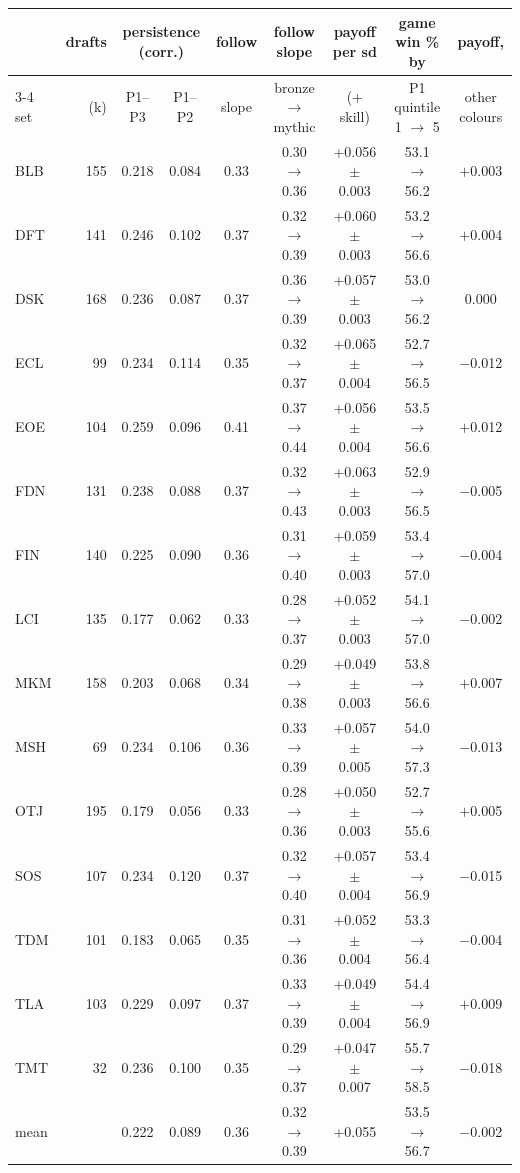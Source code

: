 \begin{tabular}{lr cc c c c c c}
\toprule
 & drafts & \multicolumn{2}{c}{persistence (corr.)} & follow & follow slope & payoff per sd & game win \% by & payoff, \\
\cmidrule(lr){3-4}
set & (k) & P1--P3 & P1--P2 & slope & bronze $\to$ mythic & (+ skill) & P1 quintile 1 $\to$ 5 & other colours \\
\midrule
BLB & 155 & 0.218 & 0.084 & 0.33 & 0.30 $\to$ 0.36 & +0.056 $\pm$ 0.003 & 53.1 $\to$ 56.2 & $+$0.003 \\
DFT & 141 & 0.246 & 0.102 & 0.37 & 0.32 $\to$ 0.39 & +0.060 $\pm$ 0.003 & 53.2 $\to$ 56.6 & $+$0.004 \\
DSK & 168 & 0.236 & 0.087 & 0.37 & 0.36 $\to$ 0.39 & +0.057 $\pm$ 0.003 & 53.0 $\to$ 56.2 & 0.000 \\
ECL & 99 & 0.234 & 0.114 & 0.35 & 0.32 $\to$ 0.37 & +0.065 $\pm$ 0.004 & 52.7 $\to$ 56.5 & $-$0.012 \\
EOE & 104 & 0.259 & 0.096 & 0.41 & 0.37 $\to$ 0.44 & +0.056 $\pm$ 0.004 & 53.5 $\to$ 56.6 & $+$0.012 \\
FDN & 131 & 0.238 & 0.088 & 0.37 & 0.32 $\to$ 0.43 & +0.063 $\pm$ 0.003 & 52.9 $\to$ 56.5 & $-$0.005 \\
FIN & 140 & 0.225 & 0.090 & 0.36 & 0.31 $\to$ 0.40 & +0.059 $\pm$ 0.003 & 53.4 $\to$ 57.0 & $-$0.004 \\
LCI & 135 & 0.177 & 0.062 & 0.33 & 0.28 $\to$ 0.37 & +0.052 $\pm$ 0.003 & 54.1 $\to$ 57.0 & $-$0.002 \\
MKM & 158 & 0.203 & 0.068 & 0.34 & 0.29 $\to$ 0.38 & +0.049 $\pm$ 0.003 & 53.8 $\to$ 56.6 & $+$0.007 \\
MSH & 69 & 0.234 & 0.106 & 0.36 & 0.33 $\to$ 0.39 & +0.057 $\pm$ 0.005 & 54.0 $\to$ 57.3 & $-$0.013 \\
OTJ & 195 & 0.179 & 0.056 & 0.33 & 0.28 $\to$ 0.36 & +0.050 $\pm$ 0.003 & 52.7 $\to$ 55.6 & $+$0.005 \\
SOS & 107 & 0.234 & 0.120 & 0.37 & 0.32 $\to$ 0.40 & +0.057 $\pm$ 0.004 & 53.4 $\to$ 56.9 & $-$0.015 \\
TDM & 101 & 0.183 & 0.065 & 0.35 & 0.31 $\to$ 0.36 & +0.052 $\pm$ 0.004 & 53.3 $\to$ 56.4 & $-$0.004 \\
TLA & 103 & 0.229 & 0.097 & 0.37 & 0.33 $\to$ 0.39 & +0.049 $\pm$ 0.004 & 54.4 $\to$ 56.9 & $+$0.009 \\
TMT & 32 & 0.236 & 0.100 & 0.35 & 0.29 $\to$ 0.37 & +0.047 $\pm$ 0.007 & 55.7 $\to$ 58.5 & $-$0.018 \\
\midrule
mean & & 0.222 & 0.089 & 0.36 & 0.32 $\to$ 0.39 & +0.055 & 53.5 $\to$ 56.7 & $-$0.002 \\
\bottomrule
\end{tabular}
